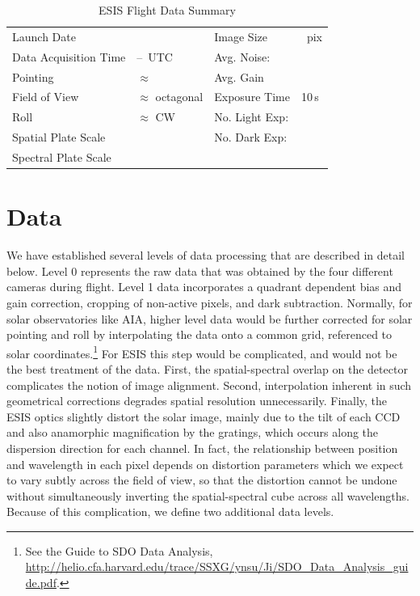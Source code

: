 		\begin{table}
		\begin{center}
			\caption{ESIS Flight Data Summary}
			\label{tab:data_info}
			\begin{tabular}{ll|ll}\hline
				Launch Date & \dateMission & Image Size  & \imageShape~pix\\
				Data Acquisition Time & \timeDataStart--\timeDataStop~UTC & Avg. Noise: & \readoutNoise\tablenotemark{a}\\ 
			    Pointing   &  $\approx$ \esispointing & Avg. Gain &   \gain \\
				Field of View  & $\approx$ \esisfov octagonal  & Exposure Time & 10\,s \\
				Roll & $\approx$ \esisroll CW & No. Light Exp: &\numDataFrames\\
			    Spatial  Plate Scale  &  \plateScale & No. Dark Exp: &\numDarkFrames \\
				Spectral  Plate Scale  &  \dispersion & \\
					\hline
			\end{tabular}
		\end{center}
		\end{table}
		
		



	
\section{Data} 

We have established several levels of data processing that are described in detail below.
Level 0 represents the raw data that was obtained by the four different cameras during flight.
Level 1 data incorporates %
a quadrant dependent bias and gain correction, cropping of non-active pixels, and dark subtraction.
Normally, for solar observatories like AIA, higher level data would be further corrected for solar pointing and roll by interpolating the data onto a common grid, referenced to solar coordinates.\footnote{See the Guide to SDO Data Analysis, \url{http://helio.cfa.harvard.edu/trace/SSXG/ynsu/Ji/SDO_Data_Analysis_guide.pdf}.}  For ESIS this step would be complicated, and would not be the best treatment of the data.  
First, the spatial-spectral overlap on the detector complicates the notion of image alignment. Second, interpolation inherent in such geometrical corrections degrades spatial resolution unnecessarily.  
Finally, the ESIS optics slightly distort the solar image, mainly due to the tilt of each CCD and also anamorphic magnification by the gratings, which occurs along the dispersion direction for each channel. 
In fact, the relationship between position and wavelength in each pixel depends on distortion parameters which we expect to vary subtly across the field of view, so that the distortion cannot be undone without simultaneously inverting the spatial-spectral cube across all wavelengths.
Because of this complication, we define two additional data levels.  

